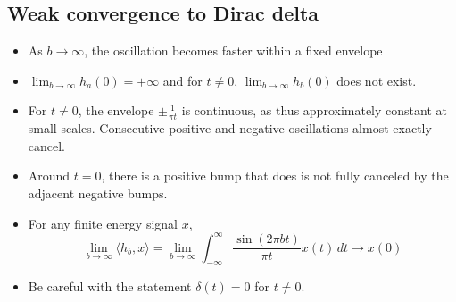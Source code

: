 \documentclass{ximera}
\begin{document}


\subsection{Weak convergence to Dirac delta}
  \begin{itemize}
  \item As $b \to \infty$, the oscillation becomes faster within a fixed envelope
  \item $\lim_{b \to \infty} h_a(0) =+\infty$ and for $t\neq 0$, $\lim_{b \to \infty} h_b(0)$ does not exist.
  \item For $t \neq 0$, the envelope $\pm \frac{1}{\pi t}$ is continuous, as thus approximately constant at small scales. Consecutive positive and negative oscillations almost exactly cancel.
  \item Around $t = 0$, there is a positive bump that does is not fully canceled by the adjacent negative bumps.
  \item For any finite energy signal $x$,
    \[
      \lim_{b \to \infty} \langle h_b, x\rangle = \lim_{b \to \infty} \int_{-\infty}^{\infty} \frac{\sin(2 \pi b t)}{\pi t} x(t)\,dt \to x(0)
    \]
  \item Be careful with the statement $\delta(t) = 0$ for $t \neq 0$.
  \end{itemize}
\end{document}
